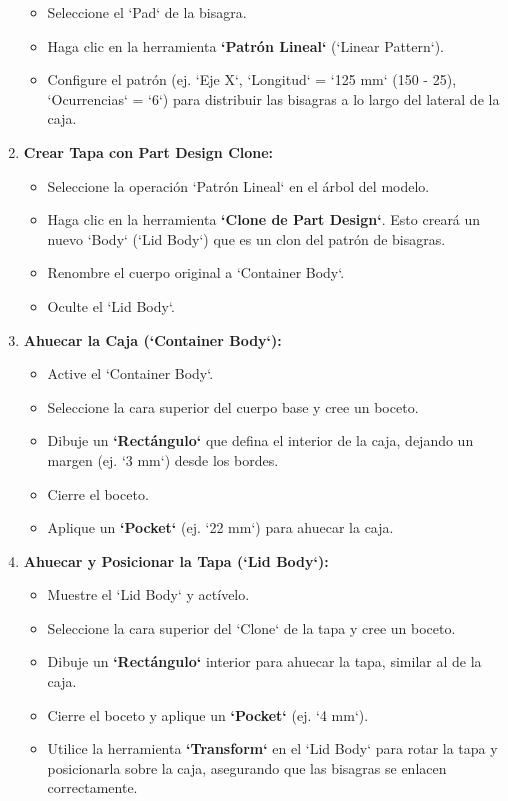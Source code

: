 \documentclass[12pt]{article}
\begin{document}
\begin{enumerate}[label=\arabic*)]
\begin{itemize}[label=\textendash]
        \item Seleccione el `Pad` de la bisagra.
        \item Haga clic en la herramienta \textbf{`Patrón Lineal`} (`Linear Pattern`).
        \item Configure el patrón (ej. `Eje X`, `Longitud` = `125 mm` (150 - 25), `Ocurrencias` = `6`) para distribuir las bisagras a lo largo del lateral de la caja.
    \end{itemize}
    \item \textbf{Crear Tapa con Part Design Clone:}
    \begin{itemize}[label=\textendash]
        \item Seleccione la operación `Patrón Lineal` en el árbol del modelo.
        \item Haga clic en la herramienta \textbf{`Clone de Part Design`}. Esto creará un nuevo `Body` (`Lid Body`) que es un clon del patrón de bisagras.
        \item Renombre el cuerpo original a `Container Body`.
        \item Oculte el `Lid Body`.
    \end{itemize}
    \item \textbf{Ahuecar la Caja (`Container Body`):}
    \begin{itemize}[label=\textendash]
        \item Active el `Container Body`.
        \item Seleccione la cara superior del cuerpo base y cree un boceto.
        \item Dibuje un \textbf{`Rectángulo`} que defina el interior de la caja, dejando un margen (ej. `3 mm`) desde los bordes.
        \item Cierre el boceto.
        \item Aplique un \textbf{`Pocket`} (ej. `22 mm`) para ahuecar la caja.
    \end{itemize}
    \item \textbf{Ahuecar y Posicionar la Tapa (`Lid Body`):}
    \begin{itemize}[label=\textendash]
        \item Muestre el `Lid Body` y actívelo.
        \item Seleccione la cara superior del `Clone` de la tapa y cree un boceto.
        \item Dibuje un \textbf{`Rectángulo`} interior para ahuecar la tapa, similar al de la caja.
        \item Cierre el boceto y aplique un \textbf{`Pocket`} (ej. `4 mm`).
        \item Utilice la herramienta \textbf{`Transform`} en el `Lid Body` para rotar la tapa y posicionarla sobre la caja, asegurando que las bisagras se enlacen correctamente.
    \end{itemize}
\end{enumerate}
\end{document}
